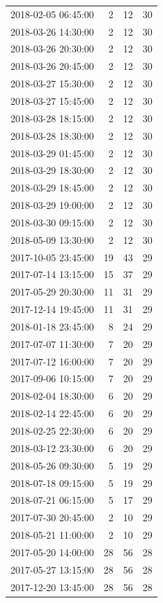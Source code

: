 \begin{tabular}{lrrr}
2018-02-05 06:45:00 & 2 & 12 & 30 \\
2018-03-26 14:30:00 & 2 & 12 & 30 \\
2018-03-26 20:30:00 & 2 & 12 & 30 \\
2018-03-26 20:45:00 & 2 & 12 & 30 \\
2018-03-27 15:30:00 & 2 & 12 & 30 \\
2018-03-27 15:45:00 & 2 & 12 & 30 \\
2018-03-28 18:15:00 & 2 & 12 & 30 \\
2018-03-28 18:30:00 & 2 & 12 & 30 \\
2018-03-29 01:45:00 & 2 & 12 & 30 \\
2018-03-29 18:30:00 & 2 & 12 & 30 \\
2018-03-29 18:45:00 & 2 & 12 & 30 \\
2018-03-29 19:00:00 & 2 & 12 & 30 \\
2018-03-30 09:15:00 & 2 & 12 & 30 \\
2018-05-09 13:30:00 & 2 & 12 & 30 \\
2017-10-05 23:45:00 & 19 & 43 & 29 \\
2017-07-14 13:15:00 & 15 & 37 & 29 \\
2017-05-29 20:30:00 & 11 & 31 & 29 \\
2017-12-14 19:45:00 & 11 & 31 & 29 \\
2018-01-18 23:45:00 & 8 & 24 & 29 \\
2017-07-07 11:30:00 & 7 & 20 & 29 \\
2017-07-12 16:00:00 & 7 & 20 & 29 \\
2017-09-06 10:15:00 & 7 & 20 & 29 \\
2018-02-04 18:30:00 & 6 & 20 & 29 \\
2018-02-14 22:45:00 & 6 & 20 & 29 \\
2018-02-25 22:30:00 & 6 & 20 & 29 \\
2018-03-12 23:30:00 & 6 & 20 & 29 \\
2018-05-26 09:30:00 & 5 & 19 & 29 \\
2018-07-18 09:15:00 & 5 & 19 & 29 \\
2018-07-21 06:15:00 & 5 & 17 & 29 \\
2017-07-30 20:45:00 & 2 & 10 & 29 \\
2018-05-21 11:00:00 & 2 & 10 & 29 \\
2017-05-20 14:00:00 & 28 & 56 & 28 \\
2017-05-27 13:15:00 & 28 & 56 & 28 \\
2017-12-20 13:45:00 & 28 & 56 & 28 \\

\end{tabular}
